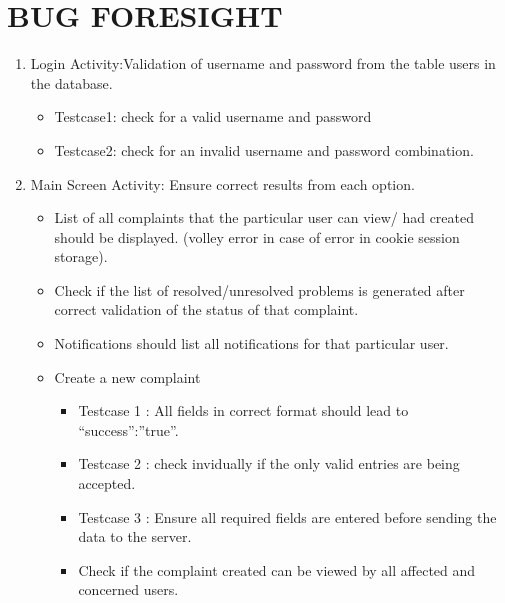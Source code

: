 \documentclass[a4paper]{article}
\begin{document}
\section{BUG FORESIGHT}
\begin{enumerate}
\item Login Activity:Validation of username and password from the table users in the database.
\begin{itemize}
\item Testcase1: check for a valid username and password
\item Testcase2: check for an invalid username and password combination.
\end{itemize}
\item Main Screen Activity: Ensure correct results from each option.
\begin{itemize}
\item List of all complaints that the particular user can view/ had created should be displayed. (volley error in case of error in cookie session storage).
\item Check if the list of resolved/unresolved problems is generated after correct validation of the status of that complaint.
\item Notifications should list all notifications for that particular user.
\item Create a new complaint
\begin{itemize}
\renewcommand\labelitemi{--}
\item Testcase 1 : All fields in correct format should lead to “success”:”true”.
\item Testcase 2 : check invidually if the only valid entries are being accepted.
\item Testcase 3 : Ensure all required fields are entered before sending the data to the server.
\item Check if the complaint created can be viewed by all affected and concerned users.


\end{itemize}
\end{itemize}
\end{enumerate}
\end{document}
